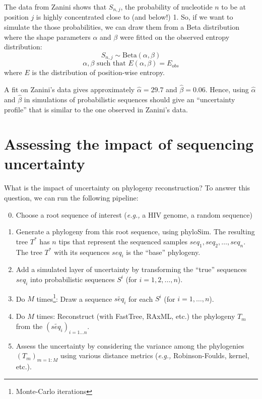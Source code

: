 \documentclass[12pt]{article}
\newcommand{\betadist}[1]{\mathrm{Beta}\left(#1\right)}
\newcommand{\eg}{\textit{e.g.,}\xspace}
\begin{document}
The data from Zanini shows that $S_{n,j}$, the probability of nucleotide $n$ to be at position $j$ is highly concentrated close to (and below!) 1. 
So, if we want to simulate the those probabilities, we can draw them from a Beta distribution where the shape parameters $\alpha$ and $\beta$ were fitted on the observed entropy distribution:
\begin{equation}
\label{eq:beta_sampling}
S_{n,j} \sim \betadist{\alpha, \beta}
\end{equation}
\begin{equation}
\alpha, \beta \text{ such that } E(\alpha,\beta) = E_{obs}
\end{equation}
where $E$ is the distribution of position-wise entropy.

A fit on Zanini's data gives approximately $\hat{\alpha} = 29.7$ and $\hat{\beta} = 0.06$. Hence, using $\hat{\alpha}$ and $\hat{\beta}$ in simulations of probabilistic sequences should give an ``uncertainty profile'' that is similar to the one observed in Zanini's data. 



\section{Assessing the impact of sequencing uncertainty}


What is the impact of uncertainty on phylogeny reconstruction? 
To answer this question, we can run the following pipeline:

\begin{enumerate}
\setcounter{enumi}{-1} 
\item Choose a root sequence of interest (\eg a HIV genome, a random sequence)
\item Generate a phylogeny from this root sequence, using \textsf{phyloSim}. The resulting tree $T^*$ has $n$ tips that represent the sequenced samples $seq_1, seq_2,\ldots, seq_n$. The tree $T^*$ with its sequences $seq_i$ is the ``base'' phylogeny.
\item Add a simulated layer of uncertainty by transforming the ``true'' sequences $seq_i$ into probabilistic sequences $S^i$ (for $i=1,2,\ldots,n$).
\item Do $M$ times\footnote{Monte-Carlo iterations}: 
Draw a sequence $\widetilde{seq_i}$ for each $S^i$ (for $i=1,\ldots, n$).
\item Do $M$ times: Reconstruct (with \textsf{FastTree}, \textsf{RAxML}, etc.) the phylogeny $T_m$ from the $(\widetilde{seq_i})_{i=1\ldots n}$. 
\item Assess the uncertainty by considering the variance among the phylogenies $(T_m)_{m=1:M}$ using various distance metrics (\eg Robinson-Foulds, kernel, etc.).
\end{enumerate}
\end{document}
